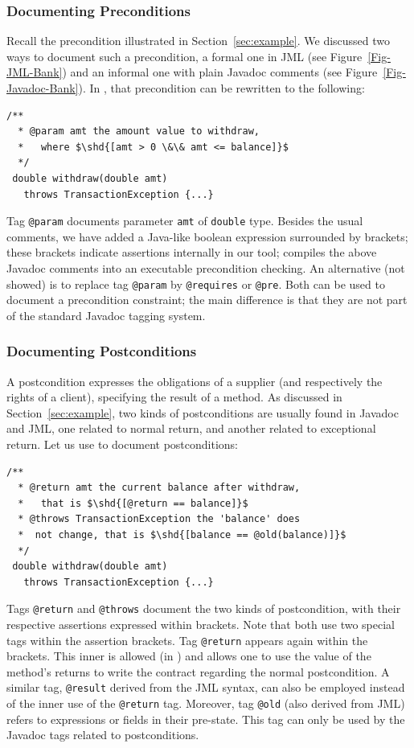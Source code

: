 \subsubsection{Documenting Preconditions}
Recall the precondition illustrated in Section~\ref{sec:example}.
We discussed two ways to document such a precondition, a formal
one in JML (see Figure~\ref{Fig-JML-Bank}) and an informal one with
plain Javadoc comments (see Figure~\ref{Fig-Javadoc-Bank}).
In \contractjdoc, that precondition can be rewritten to the
following:
\begin{lstlisting}[basicstyle=\footnotesize\ttfamily,name=figxpi, frame=lines, mathescape=true]
 /**
  * @param amt the amount value to withdraw, 
  *   where $\shd{[amt > 0 \&\& amt <= balance]}$
  */
 double withdraw(double amt) 
   throws TransactionException {...}
\end{lstlisting}
Tag \lstinline!@param! documents parameter \lstinline!amt! of \lstinline!double! type.
Besides the usual comments, we have added a Java-like boolean expression
surrounded by brackets; these brackets indicate assertions internally in our
tool; \contractjdoc{} compiles the above Javadoc comments into an executable
precondition checking.
An alternative (not showed) is to replace tag \lstinline!@param!
by \lstinline!@requires! or \lstinline!@pre!. Both can be used
to document a precondition constraint; the main difference is that
they are not part of the standard Javadoc tagging system.

\subsubsection{Documenting Postconditions}
A postcondition expresses the obligations of a supplier (and
respectively the rights of a client), specifying the result of a method.
As discussed in Section~\ref{sec:example}, two kinds of
postconditions are usually found in Javadoc and JML, one related to normal return, and another related to
exceptional return. Let us use \contractjdoc{} to document postconditions:
\begin{lstlisting}[basicstyle=\footnotesize\ttfamily,name=figxpi, frame=lines, mathescape=true]
 /**
  * @return amt the current balance after withdraw,
  *   that is $\shd{[@return == balance]}$
  * @throws TransactionException the 'balance' does
  *  not change, that is $\shd{[balance == @old(balance)]}$
  */
 double withdraw(double amt) 
   throws TransactionException {...}
\end{lstlisting}
Tags \lstinline!@return! and \lstinline!@throws! document
the two kinds of postcondition, with their respective assertions
expressed within brackets. Note that both use two special tags within
the assertion brackets. Tag \lstinline!@return! appears again within
the brackets. This inner is allowed (in \contractjdoc{}) and allows one
to use the value of the method's  returns to write the contract regarding
the normal postcondition. A similar tag, \lstinline!@result! derived from the JML syntax,
can also be employed instead of the inner use of the \lstinline!@return! tag.
Moreover, tag \lstinline!@old! (also derived from JML) refers to
expressions or fields in their pre-state. This tag can only be used
by the Javadoc tags related to postconditions.

